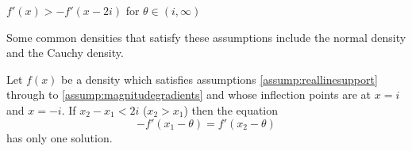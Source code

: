		\begin{assumption}
			$f'(x) > -f'(x - 2i)$ for $\theta \in (i,\infty)$
			\label{assump:magnitudegradients}
		\end{assumption}
		
		Some common densities that satisfy these assumptions include the normal density and the Cauchy density.
		
		\begin{lemma}
			\label{lem:magnitudegradients}
			Let $f(x)$ be a density which satisfies assumptions \ref{assump:reallinesupport} through to \ref{assump:magnitudegradients} and whose inflection points are at $x=i$ and $x=-i$. If 
			$x_2 - x_1 < 2i$ ($x_2 > x_1$) then the equation
			\begin{equation}
				-f'(x_1 - \theta) = f'(x_2 - \theta)
				\label{eq:gradientsequal}
			\end{equation}
			has only one solution.
		\end{lemma}
